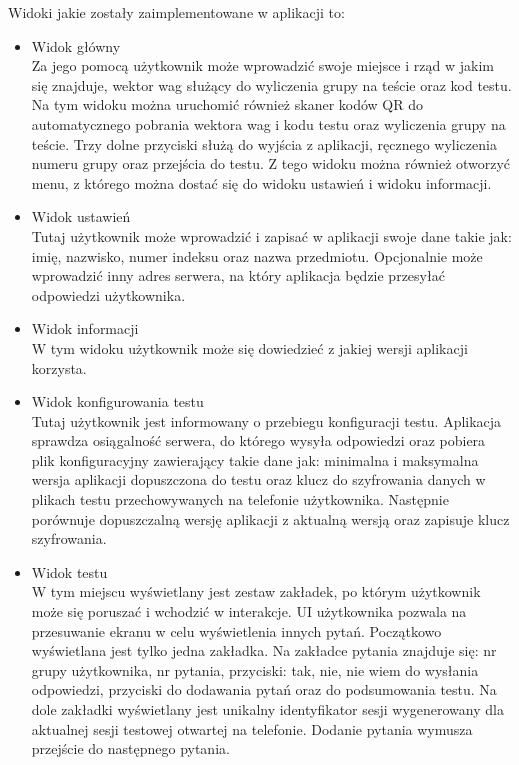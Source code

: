 \documentclass{report}
\begin{document}
			Widoki jakie zostały zaimplementowane w aplikacji to:
			\begin{itemize}
				\item Widok główny\\
				Za jego pomocą użytkownik może wprowadzić swoje miejsce i rząd w jakim się znajduje, wektor wag służący do wyliczenia grupy na teście oraz kod testu. Na tym widoku można uruchomić również skaner kodów QR do automatycznego pobrania wektora wag i kodu testu oraz wyliczenia grupy na teście. Trzy dolne przyciski służą do wyjścia z aplikacji, ręcznego wyliczenia numeru grupy oraz przejścia do testu. Z tego widoku można również otworzyć menu, z którego można dostać się do widoku ustawień i widoku informacji.
			
				\item Widok ustawień\\
				Tutaj użytkownik może wprowadzić i zapisać w aplikacji swoje dane takie jak: imię, nazwisko, numer indeksu oraz nazwa przedmiotu. Opcjonalnie może wprowadzić inny adres serwera, na który aplikacja będzie przesyłać odpowiedzi użytkownika.
				
				\item Widok informacji\\
				W tym widoku użytkownik może się dowiedzieć z jakiej wersji aplikacji korzysta.
				
				\item Widok konfigurowania testu\\
				Tutaj użytkownik jest informowany o przebiegu konfiguracji testu. Aplikacja sprawdza osiągalność serwera, do którego wysyła odpowiedzi oraz pobiera plik konfiguracyjny zawierający takie dane jak: minimalna i maksymalna wersja aplikacji dopuszczona do testu oraz klucz do szyfrowania danych w plikach testu przechowywanych na telefonie użytkownika. Następnie porównuje dopuszczalną wersję aplikacji z aktualną wersją oraz zapisuje klucz szyfrowania.
				
				\item Widok testu\\
				W tym miejscu wyświetlany jest zestaw zakładek, po którym użytkownik może się poruszać i wchodzić w interakcje. UI użytkownika pozwala na przesuwanie ekranu w celu wyświetlenia innych pytań. Początkowo wyświetlana jest tylko jedna zakładka. Na zakładce pytania znajduje się: nr grupy użytkownika, nr pytania, przyciski: tak, nie, nie wiem do wysłania odpowiedzi, przyciski do dodawania pytań oraz do podsumowania testu. Na dole zakładki wyświetlany jest unikalny identyfikator sesji wygenerowany dla aktualnej sesji testowej otwartej na telefonie. Dodanie pytania wymusza przejście do następnego pytania. 
				

\end{itemize}
\end{document}
